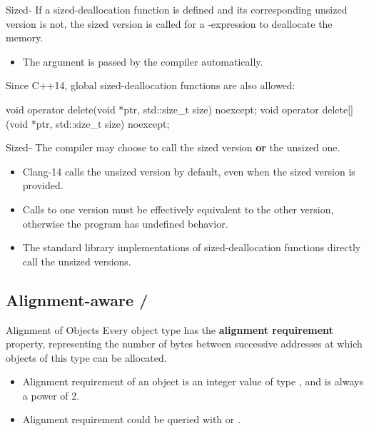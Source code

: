 \documentclass{beamer}
\begin{document}
\begin{frame}[fragile]{Sized-}
  If a sized-deallocation function is defined and its corresponding unsized version is not, the sized version is called for a -expression to deallocate the memory.
  \begin{itemize}
    \item The  argument is passed by the compiler automatically.
  \end{itemize}
  \pause
  Since C++14, global sized-deallocation functions are also allowed:
  \begin{cpp}[\scriptsize]
void operator delete(void *ptr, std::size_t size) noexcept;
void operator delete[](void *ptr, std::size_t size) noexcept;
  \end{cpp}
\end{frame}

\begin{frame}{Sized-}
  The compiler may choose to call the sized version \textbf{or} the unsized one.
  \begin{itemize}
    \item Clang-14 calls the unsized version by default, even when the sized version is provided.
    \item Calls to one version must be effectively equivalent to the other version, otherwise the program has undefined behavior.
    \item The standard library implementations of sized-deallocation functions directly call the unsized versions.
  \end{itemize}
\end{frame}

\subsection{Alignment-aware /}

\begin{frame}{Alignment of Objects}
  Every object type has the \textbf{alignment requirement} property, representing the number of bytes between successive addresses at which objects of this type can be allocated.
  \begin{itemize}
    \item Alignment requirement of an object is an integer value of type , and is always a power of 2.
    \item Alignment requirement could be queried with  or .
  \end{itemize}
\end{frame}
\end{document}
